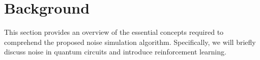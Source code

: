 \documentclass[referee,sn-basic]{sn-jnl} %
\begin{document}


\section{Background}\label{sec_background}
This section provides an overview of the essential concepts required to comprehend the proposed noise simulation algorithm. 
Specifically, we will briefly discuss noise in quantum circuits and introduce reinforcement learning.
\end{document}
